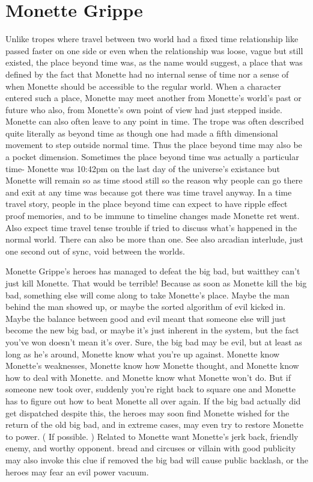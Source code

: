 \documentclass[12pt]{book}
\begin{document}
\chapter{Monette Grippe}

Unlike tropes where travel between two world had a fixed time relationship like passed faster on one side or even when the relationship was loose, vague but still existed, the place beyond time was, as the name would suggest, a place that was defined by the fact that Monette had no internal sense of time nor a sense of when Monette should be accessible to the regular world. When a character entered such a place, Monette may meet another from Monette's world's past or future who also, from Monette's own point of view had just stepped inside. Monette can also often leave to any point in time. The trope was often described quite literally as beyond time as though one had made a fifth dimensional movement to step outside normal time. Thus the place beyond time may also be a pocket dimension. Sometimes the place beyond time was actually a particular time- Monette was 10:42pm on the last day of the universe's existance but Monette will remain so as time stood still so the reason why people can go there and exit at any time was because got there was time travel anyway. In a time travel story, people in the place beyond time can expect to have ripple effect proof memories, and to be immune to timeline changes made Monette ret went. Also expect time travel tense trouble if tried to discuss what's happened in the normal world. There can also be more than one. See also arcadian interlude, just one second out of sync, void between the worlds.



Monette Grippe's heroes has managed to defeat the big bad, but waitthey can't just kill Monette. That would be terrible! Because as soon as Monette kill the big bad, something else will come along to take Monette's place. Maybe the man behind the man showed up, or maybe the sorted algorithm of evil kicked in. Maybe the balance between good and evil meant that someone else will just become the new big bad, or maybe it's just inherent in the system, but the fact you've won doesn't mean it's over. Sure, the big bad may be evil, but at least as long as he's around, Monette know what you're up against. Monette know Monette's weaknesses, Monette know how Monette thought, and Monette know how to deal with Monette. and Monette know what Monette won't do. But if someone new took over, suddenly you're right back to square one and Monette has to figure out how to beat Monette all over again. If the big bad actually did get dispatched despite this, the heroes may soon find Monette wished for the return of the old big bad, and in extreme cases, may even try to restore Monette to power. ( If possible. ) Related to Monette want Monette's jerk back, friendly enemy, and worthy opponent. bread and circuses or villain with good publicity may also invoke this clue if removed the big bad will cause public backlash, or the heroes may fear an evil power vacuum.
\end{document}
